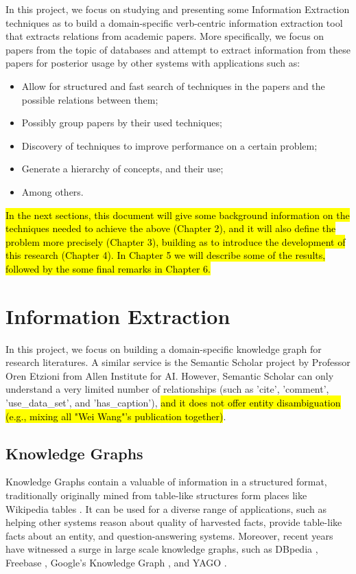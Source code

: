 \documentclass[11pt,a4paper,openright]{memoir}
\begin{document}
In this project, we focus on studying and presenting some Information Extraction techniques as to build a domain-specific verb-centric information extraction tool that extracts relations from academic papers. More specifically, we focus on papers from the topic of databases and attempt to extract information from these papers for posterior usage by other systems with applications such as:
\begin{itemize}
\item Allow for structured and fast search of techniques in the papers and the possible relations between them;
\item Possibly group papers by their used techniques;
\item Discovery of techniques to improve performance on a certain problem;
\item Generate a hierarchy of concepts, and their use;
\item Among others.
\end{itemize}

\hl{In the next sections, this document will give some background information on the techniques needed to achieve the above (Chapter 2), and it will also define the problem more precisely (Chapter 3), building as to introduce the development of this research (Chapter 4). In Chapter 5 we will describe some of the results, followed by the some final remarks in Chapter 6.}


\chapter{Information Extraction}

In this project, we focus on building a domain-specific knowledge graph for research literatures. A similar service is the Semantic Scholar \cite{semanticscholar} project by Professor Oren Etzioni from Allen Institute for AI. However, Semantic Scholar can only understand a very limited number of relationships (such as 'cite', 'comment', 'use\_data\_set', and 'has\_caption'), \hl{and it does not offer entity disambiguation (e.g., mixing all "Wei Wang"'s publication together)}.

\section{Knowledge Graphs}

Knowledge Graphs contain a valuable of information in a structured format, traditionally originally mined from table-like structures form places like Wikipedia \cite{wiki} tables \cite{dbpedia-swj}. It can be used for a diverse range of applications, such as helping other systems reason about quality of harvested facts\cite{Suchanek2007}, provide table-like facts about an entity\cite{google}, and question-answering systems\cite{hixon-clark-hajishirzi-2015}. Moreover, recent years have witnessed a surge in large scale knowledge graphs, such as DBpedia \cite{dbpedia-swj}, Freebase \cite{Bollacker2008}, Google’s Knowledge Graph \cite{google}, and YAGO \cite{Suchanek2007}.
\end{document}
